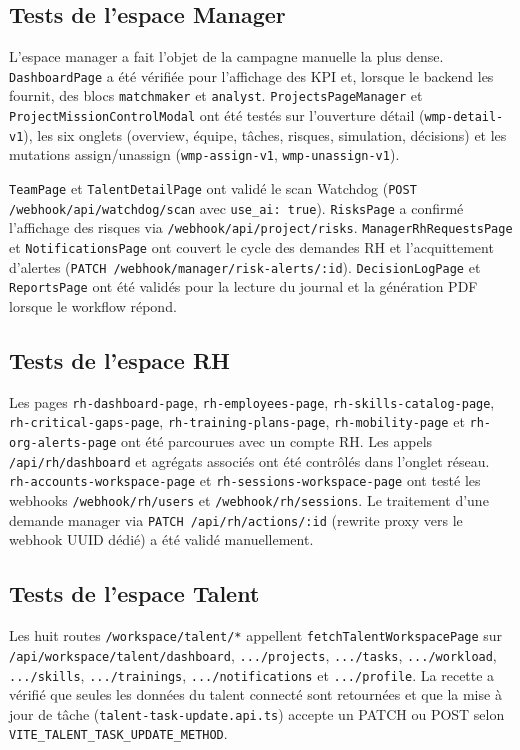 \subsection{Tests de l'espace Manager}

L'espace manager a fait l'objet de la campagne manuelle la plus dense. \texttt{DashboardPage} a été vérifiée pour l'affichage des KPI et, lorsque le backend les fournit, des blocs \texttt{matchmaker} et \texttt{analyst}. \texttt{ProjectsPageManager} et \texttt{ProjectMissionControlModal} ont été testés sur l'ouverture détail (\texttt{wmp-detail-v1}), les six onglets (overview, équipe, tâches, risques, simulation, décisions) et les mutations assign/unassign (\texttt{wmp-assign-v1}, \texttt{wmp-unassign-v1}).

\texttt{TeamPage} et \texttt{TalentDetailPage} ont validé le scan Watchdog (\texttt{POST /webhook/api/watchdog/scan} avec \texttt{use\_ai: true}). \texttt{RisksPage} a confirmé l'affichage des risques via \texttt{/webhook/api/project/risks}. \texttt{ManagerRhRequestsPage} et \texttt{NotificationsPage} ont couvert le cycle des demandes RH et l'acquittement d'alertes (\texttt{PATCH /webhook/manager/risk-alerts/:id}). \texttt{DecisionLogPage} et \texttt{ReportsPage} ont été validés pour la lecture du journal et la génération PDF lorsque le workflow répond.

\subsection{Tests de l'espace RH}

Les pages \texttt{rh-dashboard-page}, \texttt{rh-employees-page}, \texttt{rh-skills-catalog-page}, \texttt{rh-critical-gaps-page}, \texttt{rh-training-plans-page}, \texttt{rh-mobility-page} et \texttt{rh-org-alerts-page} ont été parcourues avec un compte RH. Les appels \texttt{/api/rh/dashboard} et agrégats associés ont été contrôlés dans l'onglet réseau. \texttt{rh-accounts-workspace-page} et \texttt{rh-sessions-workspace-page} ont testé les webhooks \texttt{/webhook/rh/users} et \texttt{/webhook/rh/sessions}. Le traitement d'une demande manager via \texttt{PATCH /api/rh/actions/:id} (rewrite proxy vers le webhook UUID dédié) a été validé manuellement.

\subsection{Tests de l'espace Talent}

Les huit routes \texttt{/workspace/talent/*} appellent \texttt{fetchTalentWorkspacePage} sur \texttt{/api/workspace/talent/dashboard}, \texttt{.../projects}, \texttt{.../tasks}, \texttt{.../workload}, \texttt{.../skills}, \texttt{.../trainings}, \texttt{.../notifications} et \texttt{.../profile}. La recette a vérifié que seules les données du talent connecté sont retournées et que la mise à jour de tâche (\texttt{talent-task-update.api.ts}) accepte un PATCH ou POST selon \texttt{VITE\_TALENT\_TASK\_UPDATE\_METHOD}.

